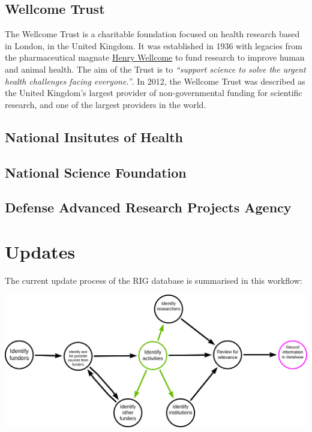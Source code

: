 \documentclass[
]{book}
\begin{document}
\hypertarget{wellcome}{%
\section{Wellcome Trust}\label{wellcome}}

The Wellcome Trust is a charitable foundation focused on health research based in London, in the United Kingdom. It was established in 1936 with legacies from the pharmaceutical magnate \href{https://en.wikipedia.org/wiki/Henry_Wellcome}{Henry Wellcome} to fund research to improve human and animal health. The aim of the Trust is to \emph{``support science to solve the urgent health challenges facing everyone.''}. In 2012, the Wellcome Trust was described as the United Kingdom's largest provider of non-governmental funding for scientific research, and one of the largest providers in the world.

\hypertarget{nih}{%
\section{National Insitutes of Health}\label{nih}}

\hypertarget{nsf}{%
\section{National Science Foundation}\label{nsf}}

\hypertarget{darpa}{%
\section{Defense Advanced Research Projects Agency}\label{darpa}}

\hypertarget{updates}{%
\chapter{Updates}\label{updates}}

The current update process of the RIG database is summarised in this workflow:

\includegraphics{images/initial-acdc-db-search_NK.png}
\end{document}
